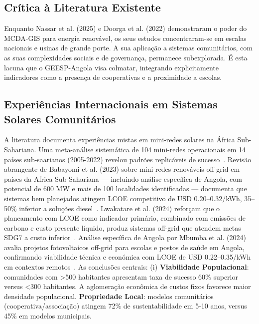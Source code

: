 \documentclass[12pt, a4paper]{article}
\begin{document}
\subsection{Crítica à Literatura Existente}
Enquanto Nassar et al. (2025) e Doorga et al. (2022) demonstraram o poder do MCDA-GIS para energia renovável, os seus estudos concentraram-se em escalas nacionais e usinas de grande porte. A sua aplicação a sistemas comunitários, com as suas complexidades sociais e de governança, permanece subexplorada. É esta lacuna que o GEESP-Angola visa colmatar, integrando explicitamente indicadores como a presença de cooperativas e a proximidade a escolas.

\subsection{Experiências Internacionais em Sistemas Solares Comunitários}
A literatura documenta experiências mistas em mini-redes solares na África Sub-Sahariana. Uma meta-análise sistemática de 104 mini-redes operacionais em 14 países sub-saarianos (2005-2022) revelou padrões replicáveis de sucesso~\citep{Duran2021}. Revisão abrangente de Babayomi et al. (2023) sobre mini-redes renováveis off-grid em países da Africa Sub-Sahariana — incluindo análise específica de Angola, com potencial de 600 MW e mais de 100 localidades identificadas — documenta que sistemas bem planejados atingem LCOE competitivo de USD 0.20–0.32/kWh, 35–50\% inferior a soluções diesel~\citep{Babayomi2023}. Lwakatare et al. (2024) reforçam que o planeamento com LCOE como indicador primário, combinado com emissões de carbono e custo presente líquido, produz sistemas off-grid que atendem metas SDG7 a custo inferior~\citep{Lwakatare2024}. Análise específica de Angola por Mbumba et al. (2024) avalia projetos fotovoltaicos off-grid para escolas e postos de saúde em Angola, confirmando viabilidade técnica e económica com LCOE de USD 0.22–0.35/kWh em contextos remotos~\citep{Mbumba2024}. As conclusões centrais: (i) 
\textbf{Viabilidade Populacional}: comunidades com >500 habitantes apresentam taxa de sucesso 60\% superior versus <300 habitantes. A aglomeração econômica de custos fixos favorece maior densidade populacional.
\textbf{Propriedade Local}: modelos comunitários (cooperativa/associação) atingem 72\% de sustentabilidade em 5-10 anos, versus 45\% em modelos municipais.
\end{document}

